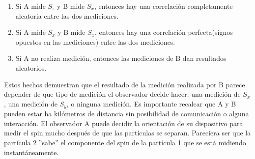 \documentclass[a4paper]{article}
\begin{document}
\begin{enumerate}
\item Si A mide $S_z$ y B mide $S_x$, entonces hay una correlación completamente aleatoria entre las dos mediciones. 
\item Si A mide $S_x$ y B mide $S_x$, entonces hay una correlación perfecta(signos opuestos en las mediciones) entre las dos mediciones.
\item Si A no realiza medición, entonces las mediciones de B dan resultados aleatorios.
\end{enumerate}
Estos hechos demuestran que el resultado de la medición realizada por B parece depender de que tipo de medición el observador decide hacer: una medición de $S_x$, una medición de $S_y$, o ninguna medición. Es importante recalcar que A y B pueden estar ha kilómetros de distancia sin posibilidad de comunicación o alguna interacción. El observador A puede decidir la orientación de su dispositivo para medir el spin mucho después de que las partículas se separan. Pareciera ser que la partícula 2 ''sabe'' el componente del spin de la partícula 1 que se está midiendo instantáneamente. 
\end{document}
